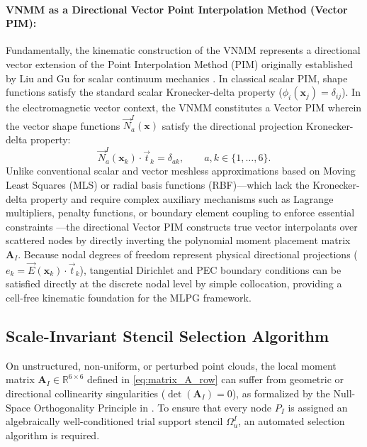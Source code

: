 \documentclass[preprint,12pt]{elsarticle}
\begin{document}
\paragraph{VNMM as a Directional Vector Point Interpolation Method (Vector PIM):}
Fundamentally, the kinematic construction of the VNMM represents a directional vector extension of the Point Interpolation Method (PIM) originally established by Liu and Gu for scalar continuum mechanics \cite{liu2001point, liu2005introduction}. In classical scalar PIM, shape functions satisfy the standard scalar Kronecker-delta property ($\phi_i(\mathbf{x}_j) = \delta_{ij}$). In the electromagnetic vector context, the VNMM constitutes a Vector PIM wherein the vector shape functions $\vec{N}_a^I(\mathbf{x})$ satisfy the directional projection Kronecker-delta property:
\begin{equation}
    \vec{N}_a^I(\mathbf{x}_k) \cdot \vec{t}_k = \delta_{ak}, \qquad a, k \in \{1, \dots, 6\}.
    \label{eq:vector_pim_kronecker}
\end{equation}
Unlike conventional scalar and vector meshless approximations based on Moving Least Squares (MLS) or radial basis functions (RBF)---which lack the Kronecker-delta property and require complex auxiliary mechanisms such as Lagrange multipliers, penalty functions, or boundary element coupling to enforce essential constraints \cite{atluri2002meshless}---the directional Vector PIM constructs true vector interpolants over scattered nodes by directly inverting the polynomial moment placement matrix $\mathbf{A}_I$. Because nodal degrees of freedom represent physical directional projections ($e_k = \vec{E}(\mathbf{x}_k) \cdot \vec{t}_k$), tangential Dirichlet and PEC boundary conditions can be satisfied directly at the discrete nodal level by simple collocation, providing a cell-free kinematic foundation for the MLPG framework.

\subsection{Scale-Invariant Stencil Selection Algorithm}
\label{subsec:stencil_selection}

On unstructured, non-uniform, or perturbed point clouds, the local moment matrix $\mathbf{A}_I \in \mathbb{R}^{6 \times 6}$ defined in \eqref{eq:matrix_A_row} can suffer from geometric or directional collinearity singularities ($\det(\mathbf{A}_I) = 0$), as formalized by the Null-Space Orthogonality Principle in \cite{stable_vnmm2d_2026}. To ensure that every node $P_I$ is assigned an algebraically well-conditioned trial support stencil $\Omega_u^I$, an automated selection algorithm is required.
\end{document}
